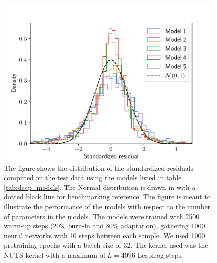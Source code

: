 \begin{figure}[h!]
    \centering
    \includegraphics[scale=0.7]{figures/standardized_residuals/standardized_residual_simple_models.pdf}
    \caption{
        The figure shows the distribution of the standardized residuals computed on the test data using the models listed in table \ref{tab:deep_models}. The Normal distribution is drawn in with a dotted black line for benchmarking reference.
        The figure is meant to illustrate the performance of the models with respect to the number of parameters in the models.
        The models were trained with 2500 warm-up steps (20\% burn-in and 80\% adaptation), gathering 1000 neural networks with 10 steps between each sample. We used 1000 pretraining epochs with a batch size of 32. The kernel used was the NUTS kernel with a maximum of $L = 4096$ Leapfrog steps. 
    }
    \label{fig:standardized_residual_vs_params}
\end{figure}

